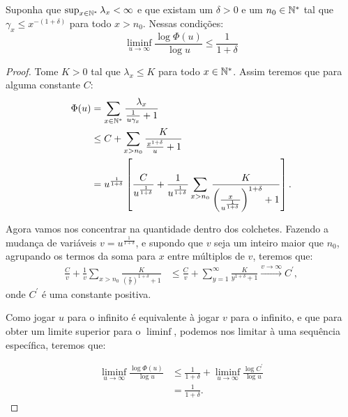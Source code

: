\begin{proposicao}
  Suponha que $\sup_{x\in{\mathbb{N^*}}}\lambda_x < \infty$ e que existam um
  $\delta>0$ e um $n_0 \in {\mathbb{N^*}}$ tal que $\gamma_x \leq x^{-(1+\delta)}$
  para todo $x > n_0$. Nessas condições:
  \begin{equation}
    \liminf_{u \to \infty} \frac{\log \Phi(u)}{\log u}  \leq \frac{1}{1+\delta}
  \end{equation}
\end{proposicao}

\begin{proof}
  Tome $K > 0$ tal que $\lambda_x \leq K$ para todo $x \in {\mathbb{N^*}}$. Assim
  teremos que para alguma constante $C$:
  \begin{align*}
    \Phi(u) &= \sum_{x \in {\mathbb{N^*}}} \frac{\lambda_x}{\frac{1}{u\gamma_x} +
      1}\\
    &\leq C + \sum_{x > n_0} \frac{K}{\frac{x^{1+\delta}}{u} + 1}\\
    &=u^{\frac{1}{1+\delta}} \left[
      \frac{C}{u^{\frac{1}{1+\delta}}} +
      \frac{1}{u^{\frac{1}{1+\delta}}} \sum_{x > n_0} \frac{K}{
        \left( \frac{x}{u^{\frac{1}{1+\delta}}}  \right)^{1+\delta}
        + 1
      }
    \right].
  \end{align*}

  Agora vamos nos concentrar na quantidade dentro dos
  colchetes. Fazendo a mudança de variáveis $v =
  u^{\frac{1}{1+\delta}}$, e supondo que $v$ seja um inteiro maior que
  $n_0$, agrupando os termos da soma para $x$ entre múltiplos de $v$,
  teremos que:
  \begin{align*}
    \frac{C}{v} + \frac{1}{v} \sum_{x > n_0} \frac{K}{ \left(
        \frac{x}{v} \right)^{1+\delta} + 1 }
    &\leq
    \frac{C}{v} + \sum_{y=1}^{\infty} \frac{K}{y^{1+\delta} + 1}
    \xrightarrow{v \to \infty} C^\prime,
  \end{align*}
  onde $C^\prime$ é uma constante positiva.

  Como jogar $u$ para o infinito é equivalente à jogar $v$ para o
  infinito, e que para obter um limite superior para o $\liminf$,
  podemos  nos limitar à uma sequência específica, teremos que:

  \begin{align*}
    \liminf_{u \to \infty} \frac{\log \Phi(u)}{\log u} &\leq
    \frac{1}{1+\delta} + \liminf_{u \to \infty} 
    \frac{\log{C^\prime}}{\log u}\\
    &= \frac{1}{1+\delta}.
  \end{align*}
\end{proof}

